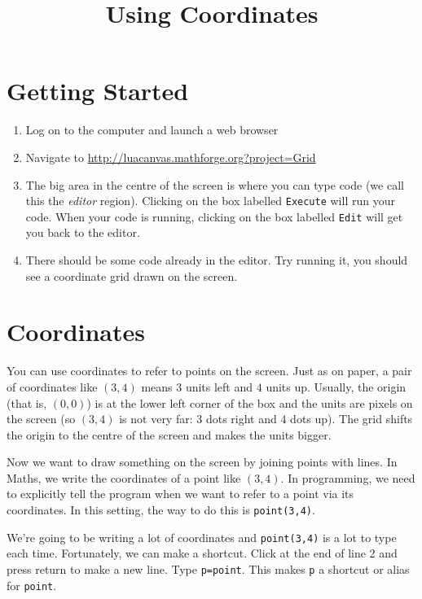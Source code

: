 \documentclass[
  xhtml,%
  use filename%
]{internet}
\title{Using Coordinates}
\begin{document}
\maketitle
\section{Getting Started}

\begin{enumerate}
\item Log on to the computer and launch a web browser
\item Navigate to \href{http://luacanvas.mathforge.org?project=Grid}{http://luacanvas.mathforge.org?project=Grid}
\item The big area in the centre of the screen is where you can type code (we call this the \emph{editor} region).
Clicking on the box labelled \verb+Execute+ will run your code.
When your code is running, clicking on the box labelled \verb+Edit+ will get you back to the editor.

\item There should be some code already in the editor.
Try running it, you should see a coordinate grid drawn on the screen.
\end{enumerate}

\section{Coordinates}

You can use coordinates to refer to points on the screen.
Just as on paper, a pair of coordinates like \((3,4)\) means \(3\) units left and \(4\) units up.
Usually, the origin (that is, \((0,0)\)) is at the lower left corner of the box and the units are pixels on the screen (so \((3,4)\) is not very far: \(3\) dots right and \(4\) dots up).
The grid shifts the origin to the centre of the screen and makes the units bigger.

Now we want to draw something on the screen by joining points with lines.
In Maths, we write the coordinates of a point like \((3,4)\).
In programming, we need to explicitly tell the program when we want to refer to a point via its coordinates.
In this setting, the way to do this is \verb+point(3,4)+.

We're going to be writing a lot of coordinates and \verb+point(3,4)+ is a lot to type each time.
Fortunately, we can make a shortcut.
Click at the end of line 2 and press return to make a new line.
Type \verb+p=point+.
This makes \verb+p+ a shortcut or alias for \verb+point+.
\end{document}
